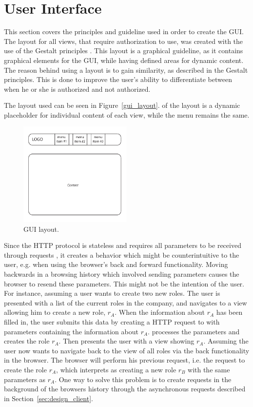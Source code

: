 \section{User Interface}

This section covers the principles and guideline used in order to create the \ac{GUI}.
The layout for all views, that require authorization to use, was created with the use of the Gestalt principles \citep{gestalt_principles}.
This layout is a graphical guideline, as it contains graphical elements for the GUI, while having defined areas for dynamic content.
The reason behind using a layout is to gain similarity, as described in the Gestalt principles.
This is done to improve the user's ability to differentiate between when he or she is authorized and not authorized.

The layout used can be seen in Figure~\ref{gui_layout}.
 of the layout is a dynamic placeholder for individual content of each view, while the menu remains the same.

\begin{figure}[htb]
    \centering
    \includegraphics[width=0.5\textwidth]{gfx/gui_layout.pdf}
    \caption{\acs{GUI} layout.}
    \label{fig:gui_layout}
\end{figure}

Since the HTTP protocol is stateless and requires all parameters to be received through requests \citep{python_stateless}, it creates a behavior which might be counterintuitive to the user, e.g. when using the browser's back and forward functionality.
Moving backwards in a browsing history which involved sending parameters causes the browser to resend these parameters.
This might not be the intention of the user.
For instance, assuming a user wants to create two new roles.
The user is presented with a list of the current roles in the company, and navigates to a view allowing him to create a new role, $r_A$.
When the information about $r_A$ has been filled in, the user submits this data by creating a HTTP request to  with parameters containing the information about $r_A$.
 processes the parameters and creates the role $r_A$.
Then  presents the user with a view showing $r_A$.
Assuming the user now wants to navigate back to the view of all roles via the back functionality in the browser.
The browser will perform his previous request, i.e. the request to create the role $r_A$, which  interprets as creating a new role $r_B$ with the same parameters as $r_A$.
One way to solve this problem is to create requests in the background of the browsers history through the asynchronous requests described in Section~\ref{sec:design_client}.
